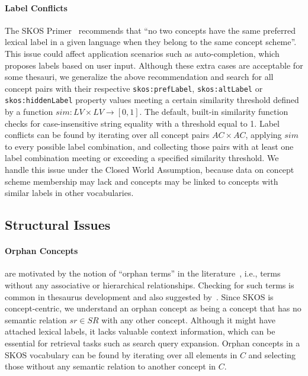 {\paragraph{Label Conflicts}

The SKOS Primer~\cite{Isaac2009} recommends that ``no two concepts have the same preferred lexical label in a given language when they belong to the same concept scheme''. This issue could affect application scenarios such as auto-completion, which proposes labels based on user input. Although these extra cases are acceptable for some thesauri, we generalize the above recommendation and search for all concept pairs with their respective \texttt{skos:prefLabel}, \texttt{skos:altLabel} or \texttt{skos:hiddenLabel} property values meeting a certain similarity threshold defined by a function $sim:LV \times LV \rightarrow [0,1]$.
The default, built-in similarity function checks for case-insensitive string equality with a threshold equal to 1. Label conflicts can be found by iterating over all concept pairs $AC \times AC$, applying $sim$ to every possible label combination, and collecting those pairs with at least one label combination meeting or exceeding a specified similarity threshold. We handle this issue under the Closed World Assumption, because data on concept scheme membership may lack and concepts may be linked to concepts with similar labels in other vocabularies.


\subsection{Structural Issues}

\paragraph{Orphan Concepts}

are motivated by the notion of ``orphan terms'' in the literature~\cite{Hedden2010}, i.e., terms without any associative or hierarchical relationships. Checking for such terms is common in thesaurus development and also suggested by~\cite{Z39.19:2005}. Since SKOS is concept-centric, we understand an orphan concept as being a concept that has no semantic relation $sr \in SR$ with any other concept. Although it might have attached lexical labels, it lacks valuable context information, which can be essential for retrieval tasks such as search query expansion.
Orphan concepts in a SKOS vocabulary can be found by iterating over all elements in $C$ and selecting those without any semantic relation to another concept in $C$.

}
